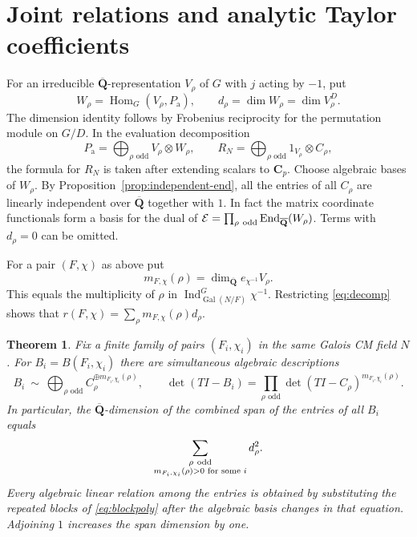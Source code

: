 \documentclass[11pt]{amsart}
\numberwithin{equation}{section}
\newtheorem{theorem}{Theorem}[section]
\theoremstyle{definition}
\theoremstyle{remark}
\newcommand{\Qbar}{\overline{\mathbf Q}}
\newcommand{\Cp}{\mathbf C_p}
\newcommand{\Gal}{\operatorname{Gal}}
\newcommand{\Hom}{\operatorname{Hom}}
\newcommand{\End}{\operatorname{End}}
\begin{document}
\section{Joint relations and analytic Taylor coefficients}
\label{sec:joint}

For an irreducible $\Qbar$-representation $V_\rho$ of $G$ with
$j$ acting by $-1$, put
\[
  W_\rho=\Hom_G(V_\rho,P_{\mathrm a}),\qquad
  d_\rho=\dim W_\rho=\dim V_\rho^{D}.
\]
The dimension identity follows by Frobenius reciprocity for
the permutation module on $G/D$. In the evaluation
decomposition
\begin{equation}\label{eq:decomp}
 P_{\mathrm a}=\bigoplus_{\rho\text{ odd}} V_\rho\otimes W_\rho,
 \qquad
 R_N=\bigoplus_{\rho\text{ odd}} 1_{V_\rho}\otimes C_\rho ,
\end{equation}
the formula for $R_N$ is taken after extending scalars to $\Cp$.
Choose algebraic bases of $W_\rho$. By
Proposition~\ref{prop:independent-end}, all the entries of all
$C_\rho$ are linearly independent over $\Qbar$ together
with $1$. In fact the matrix coordinate functionals form
a basis for the dual of
$\mathcal E=\prod_{\rho\ {\rm odd}}\End_{\Qbar}(W_\rho)$.
Terms with $d_\rho=0$ can be omitted.

For a pair $(F,\chi)$ as above put
\[
 m_{F,\chi}(\rho)=\dim_{\Qbar}e_{\chi^{-1}}V_\rho .
\]
This equals the multiplicity of $\rho$ in
$\operatorname{Ind}_{\Gal(N/F)}^G\chi^{-1}$. Restricting
\eqref{eq:decomp} shows that
$r(F,\chi)=\sum_\rho m_{F,\chi}(\rho)d_\rho$.

\begin{theorem}\label{thm:joint}
Fix a finite family of pairs $(F_i,\chi_i)$ in the same
Galois CM field $N$. For $B_i=B(F_i,\chi_i)$ there are
simultaneous algebraic descriptions
\begin{equation}\label{eq:blockpoly}
 B_i\ \sim\
 \bigoplus_{\rho\text{ odd}} C_\rho^{\oplus m_{F_i,\chi_i}(\rho)},
 \qquad
 \det(TI-B_i)=
 \prod_{\rho\text{ odd}}\det(TI-C_\rho)^{m_{F_i,\chi_i}(\rho)} .
\end{equation}
In particular, the $\Qbar$-dimension of the combined span
of the entries of all $B_i$ equals
\begin{equation}\label{eq:lineardimension}
 \sum_{\substack{\rho\ {\rm odd}\\
                 m_{F_i,\chi_i}(\rho)>0\text{ for some }i}}
                 d_\rho^2 .
\end{equation}
Every algebraic linear relation among the entries is obtained
by substituting the repeated blocks of \eqref{eq:blockpoly}
after the algebraic basis changes in that equation. Adjoining
$1$ increases the span dimension by one.
\end{theorem}
\end{document}
